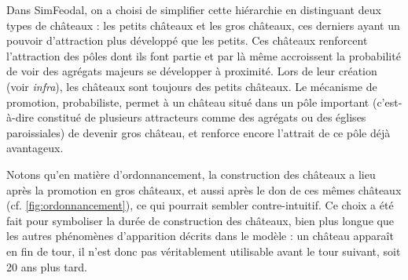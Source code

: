 \begin{tcolorbox}[breakable,left=0pt,right=0pt,top=0pt,bottom=0pt,
	colback=gray!15,colframe=gray!15,width=\dimexpr\textwidth\relax, 
	enlarge left by=0mm, boxsep=5pt,arc=0pt,outer arc=0pt]
	Dans SimFeodal, on a choisi de simplifier cette hiérarchie en distinguant deux types de châteaux : les \og petits châteaux\fg{} et les \og gros châteaux\fg{}, ces derniers ayant un pouvoir d'attraction plus développé que les petits.
	Ces châteaux renforcent l'attraction des pôles dont ils font partie et par là même accroissent la probabilité de voir des agrégats majeurs se développer à proximité.
	Lors de leur création (voir \textit{infra}), les châteaux sont toujours des \og petits châteaux\fg{}.
	Le mécanisme de promotion, probabiliste, permet à un château situé dans un pôle important (c'est-à-dire constitué de plusieurs attracteurs comme des agrégats ou des églises paroissiales) de devenir \og gros château\fg{}, et renforce encore l'attrait de ce pôle déjà avantageux.
\end{tcolorbox}

\bigskip
\begin{tcolorbox}[breakable,left=0pt,right=0pt,top=0pt,bottom=0pt,
	colback=gray!15,colframe=gray!15,width=\dimexpr\textwidth\relax, 
	enlarge left by=0mm, boxsep=5pt,arc=0pt,outer arc=0pt]
Notons qu'en matière d'ordonnancement, la construction des châteaux a lieu après la promotion en gros châteaux, et aussi après le don de ces mêmes châteaux (cf. \cref{fig:ordonnancement}), ce qui pourrait sembler contre-intuitif.
Ce choix a été fait pour symboliser la durée de construction des châteaux, bien plus longue que les autres phénomènes d'apparition décrits dans le modèle : un château apparaît en fin de tour, il n'est donc pas véritablement utilisable avant le tour suivant, soit 20 ans plus tard.
\end{tcolorbox}

